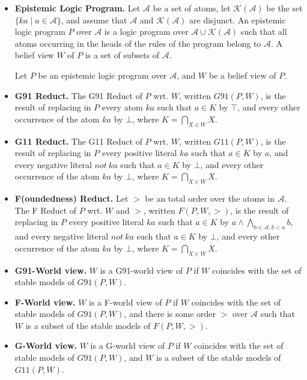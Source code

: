\documentclass{article}
\begin{document}
\begin{itemize}

\item 
\textbf{Epistemic Logic Program.}
Let $\mathcal{A}$ be a set of atoms,
let $\mathcal{K(A)}$ be the set $\{ ka \mid a \in \mathcal{A}\}$, 
and assume that $\mathcal{A}$ and $\mathcal{K(A)}$ are disjunct.
%
An epistemic logic program $P$ over $\mathcal{A}$
is a logic program over $\mathcal{A}\cup\mathcal{K(A)}$
such that all atoms occurring in the heads of the rules of 
the program belong to $\mathcal{A}$.
%
A belief view $W$ of $P$ is a set of subsets of $\mathcal{A}$.
 
Let $P$ be an epistemic logic program over $\mathcal{A}$, 
and $W$ be a belief view of $P$.

\item
\textbf{G91 Reduct.} 
The G91 Reduct of $P$ wrt. $W$, written $G91(P,W)$, 
is the result of replacing in $P$
every atom $ka$ such that $a \in K$ by $\top$, and
every other occurrence of the atom $ka$ by $\bot$, 
where $K=\bigcap_{X \in W}X$.

\item
\textbf{G11 Reduct.} 
The G11 Reduct of $P$ wrt. $W$, written $G11(P,W)$, 
is the result of replacing in $P$
every positive literal $ka$ such that $a \in K$ by $a$, and
every negative literal $not \ ka$ such that $a \in K$ by $\bot$, and
every other occurrence of the atom $ka$ by $\bot$, 
where $K=\bigcap_{X \in W}X$.

\item
\textbf{F(oundedness) Reduct.} 
Let $>$ be an total order over the atoms in $\mathcal{A}$.
%
The F Reduct of $P$ wrt. $W$ and $>$, written $F(P,W,>)$, 
is the result of replacing in $P$
every positive literal $ka$ such that $a \in K$ by 
$a \wedge \bigwedge_{b\in\mathcal{A},b < a}b$, and
every negative literal $not \ ka$ such that $a \in K$ by $\bot$, and
every other occurrence of the atom $ka$ by $\bot$, 
where $K=\bigcap_{X \in W}X$.

\item
\textbf{G91-World view.} 
$W$ is a G91-world view of $P$ if
$W$ coincides with the set of stable models of $G91(P,W)$.

\item
\textbf{F-World view.} 
$W$ is a F-world view of $P$ if
$W$ coincides with the set of stable models of $G91(P,W)$, and
there is some order $>$ over $\mathcal{A}$ such that
$W$ is a subset of the stable models of $F(P,W,>)$.

\item
\textbf{G-World view.} 
$W$ is a G-world view of $P$ if
$W$ coincides with the set of stable models of $G91(P,W)$, and
$W$ is a subset of the stable models of $G11(P,W)$.


\end{itemize}
\end{document}

